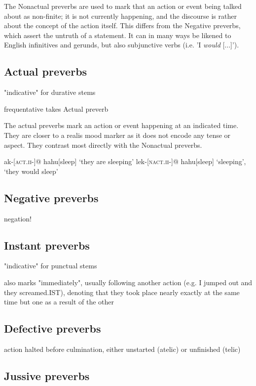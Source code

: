 \documentclass[smallroyalvopaper,9pt]{memoir} %
\begin{document}
The Nonactual preverbs are used to mark that an action or event being talked about as non-finite; it is not currently happening, and the discourse is rather about the concept of the action itself. This differs from the Negative preverbs, which assert the untruth of a statement. It can in many ways be likened to English infinitives and gerunds, but also subjunctive verbs (i.e. 'I \textit{would} [...]'). 

\subsection{Actual preverbs}

"indicative" for durative stems

frequentative takes Actual preverb

The actual preverbs mark an action or event happening at an indicated time. They are closer to a realis mood marker as it does not encode any tense or aspect. They contrast most directly with the Nonactual preverbs.

\pex
\a\begingl
ak-[\textsc{act.ii}-]@
hahu[sleep]
\glft `they are sleeping'
\endgl
\a\begingl
lek-[\textsc{nact.ii}-]@
hahu[sleep]
\glft `sleeping', `they would sleep'
\endgl
\xe

\subsection{Negative preverbs}

negation!

\subsection{Instant preverbs}

"indicative" for punctual stems

also marks "immediately", usually following another action (e.g. I jumped out and they screamed.IST), denoting that they took place nearly exactly at the same time but one as a result of the other

\subsection{Defective preverbs}

action halted before culmination, either unstarted (atelic) or unfinished (telic)

\subsection{Jussive preverbs}
\end{document}
